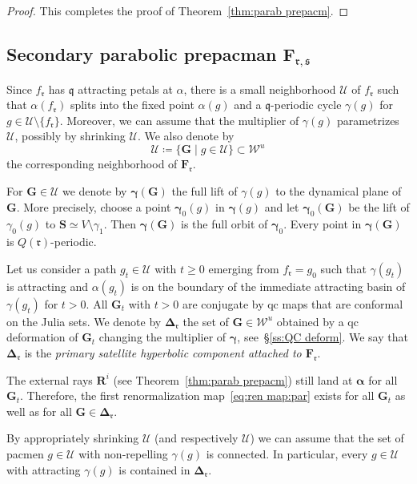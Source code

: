 \documentclass{amsart}
\newcommand{\1}{{\mathbb 1 }}
\newcommand\HH{\boldsymbol{\Delta}}%
\newcommand{\bF}{{\mathbf F}}
\newcommand{\bR}{{\mathbf R}}
\newcommand{\bS}{{\mathbf S}}
\newcommand{\bG}{{\mathbf G}}
\renewcommand{\qq}{\mathfrak{q}}
\newcommand{\rr}{\mathfrak{r}}
\renewcommand{\ss}{\mathfrak{s}}
\newcommand\Unst{{\boldsymbol{\mathcal{W}}^u}}
\newcommand\UU{\mathcal{U}}
\newcommand\bUU{{ \boldsymbol{\mathcal U}}}
\theoremstyle{remark}
\numberwithin{equation}{section}
\theoremstyle{definition}
\newcommand{\balpha}{{\boldsymbol \alpha}}
\newcommand{\bgamma}{{\boldsymbol{ \gamma}}}
\theoremstyle{nonumberbreak}
\begin{document}
\begin{proof}
This completes the proof of Theorem~\ref{thm:parab prepacm}.
\end{proof}







\subsection{Secondary parabolic prepacman $\bF_{\rr,\ss}$}
\label{ss:SecParPacm}
Since $f_\rr$ has $\qq$ attracting petals at $\alpha$, there is a small neighborhood $\UU$ of $f_\rr$ such that $\alpha(f_\rr)$ splits into the fixed point $\alpha(g)$ and a $\qq$-periodic cycle $\gamma (g)$ for $g\in \UU\setminus \{f_\rr\}$. Moreover, we can assume that the multiplier of $\gamma(g)$ parametrizes $\UU$, possibly by shrinking $\UU$. We also denote by \[\bUU\coloneqq \{\bG\mid g\in \UU\}\subset \Unst\]
the corresponding neighborhood of $\bF_\rr$.




For $\bG\in \bUU$ we denote by $\bgamma(\bG)$ the full lift of $\gamma(g)$ to the dynamical plane of $\bG$. More precisely, choose a point $\bgamma_0(g)$ in $\bgamma(g)$ and let $\bgamma_0(\bG)$ be the lift of $\gamma_0(g)$ to $\bS\simeq V\setminus \gamma_1$. Then $\bgamma(\bG)$ is the full orbit of $\bgamma_0$. Every point in  $\bgamma(\bG)$ is $Q(\rr)$-periodic.



Let us consider a path $g_{t}\in \UU$ with $t\ge 0$ emerging from $f_\rr=g_0$ such that $\gamma(g_t)$ is attracting and $\alpha(g_t)$ is on the boundary of the immediate attracting basin of $\gamma(g_t)$ for $t>0$. All $\bG_t$ with $t>0$ are conjugate by qc maps that are conformal on the Julia sets. We denote by $\HH_\rr$ the set of $\bG\in \Unst$ obtained by a qc deformation of $\bG_t$ changing the multiplier of $\bgamma$, see~\S\ref{ss:QC deform}. We say that $\HH_\rr$ is the \emph{primary satellite hyperbolic component attached to $\bF_\rr$}.


The external rays $\bR^i$ (see Theorem~\ref{thm:parab prepacm}) still land at $\balpha$ for all $\bG_t$. Therefore, the first renormalization map~\eqref{eq:ren map:par} exists for all $\bG_t$ as well as for all $\bG\in \HH_\rr$.

 By appropriately shrinking $\UU$ (and respectively $\bUU$) we can assume that the set of pacmen $g\in \UU$ with non-repelling $\gamma(g)$ is connected. In particular, every $g\in \UU$ with attracting $\gamma(g)$ is contained in $\HH_\rr$. 
 
\end{document}
